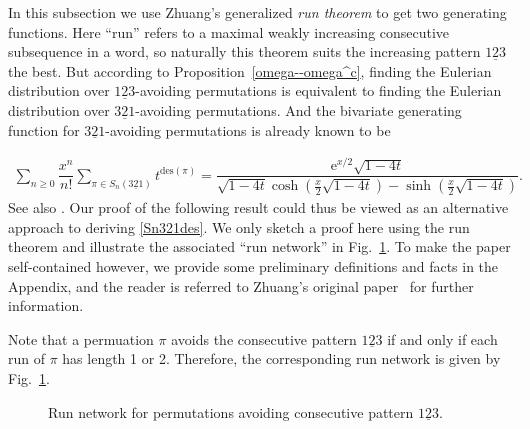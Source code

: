 
In this subsection we use Zhuang's generalized \emph{run theorem} \cite{zhu16} to get two generating functions. Here ``run'' refers to a maximal weakly increasing consecutive subsequence in a word, so naturally this theorem suits the increasing pattern $\underline{123}$ the best. But according to Proposition~\ref{omega--omega^c}, finding the Eulerian distribution over $\underline{123}$-avoiding permutations is equivalent to finding the Eulerian distribution over $\underline{321}$-avoiding permutations. And the bivariate generating function for $\underline{321}$-avoiding permutations is already known to be \cite{MR06}

\begin{align}\label{Sn321des}
	\sum_{n\geq 0}\dfrac{x^n}{n!}\sum_{\pi \in S_n(\underline{321})} t^{\mathrm{des}(\pi)}=\dfrac{\mathrm{e}^{x/2}\sqrt{1-4t}}{\sqrt{1-4t}\cosh {\left(\frac{x}{2}\sqrt{1-4t}\right)}-\sinh{\left(\frac{x}{2}\sqrt{1-4t}\right)}}.
\end{align}
See also \cite[Thm.~5.3.4]{kit11}. Our proof of the following result could thus be viewed as an alternative approach to deriving \eqref{Sn321des}. We only sketch a proof here using the run theorem and illustrate the associated ``run network'' in Fig.~\ref{sn123runnetwork}. To make the paper self-contained however, we provide some preliminary definitions and facts in the Appendix, and the reader is referred to Zhuang's original paper~\cite{zhu16} for further information.

Note that a permuation $\pi$ avoids the consecutive pattern $\underline{123}$ if and only if each run of $\pi$ has length 1 or 2. Therefore, the corresponding run network is given by Fig.~\ref{sn123runnetwork}.


\begin{figure}[htbp]	
	 \centering
\caption{Run network for permutations avoiding consecutive pattern $\underline{123}$.}
\label{sn123runnetwork}
\end{figure}

